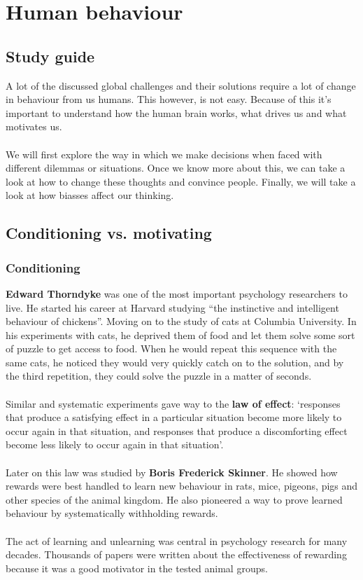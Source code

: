 \documentclass[../summary.tex]{subfiles}
\begin{document}
	\section{Human behaviour}
	
		\subsection{Study guide}
			A lot of the discussed global challenges and their solutions require a lot of change in behaviour from us humans. This however, is not easy. Because of this it's important to understand how the human brain works, what drives us and what motivates us. 
			\\\\
			We will first explore the way in which we make decisions when faced with different dilemmas or situations. Once we know more about this, we can take a look at how to change these thoughts and convince people. Finally, we will take a look at how biasses affect our thinking. 
		\subsection{Conditioning vs. motivating}
		\subsubsection{Conditioning}
			\textbf{Edward Thorndyke} was one of the most important psychology researchers to live. He started his career at Harvard studying ``the instinctive and intelligent behaviour of chickens''. Moving on to the study of cats at Columbia University. In his experiments with cats, he deprived them of food and let them solve some sort of puzzle to get access to food. When he would repeat this sequence with the same cats, he noticed they would very quickly catch on to the solution, and by the third repetition, they could solve the puzzle in a matter of seconds.
			\\\\
			Similar and systematic experiments gave way to the \textbf{law of effect}: `responses that produce a satisfying effect in a particular situation become more likely to occur again in that situation, and responses that produce a discomforting effect become less likely to occur again in that situation'.
			\\\\
			Later on this law was studied by \textbf{Boris Frederick Skinner}. He showed how rewards were best handled to learn new behaviour in rats, mice, pigeons, pigs and other species of the animal kingdom. He also pioneered a way to prove learned behaviour by systematically withholding rewards.
			\\\\
			The act of learning and unlearning was central in psychology research for many decades. Thousands of papers were written about the effectiveness of rewarding because it was a good motivator in the tested animal groups.
\end{document}
